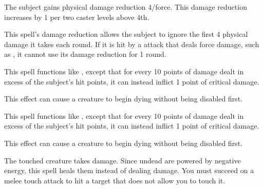 \spellrng{\rngclose}
\spelldur{\durshort}
\begin{spelleffect}
  The subject gains physical damage reduction 4/force. This damage reduction increases by 1 per two caster levels above 4th.
\end{spelleffect}
\begin{spellnotes}
  This spell's damage reduction allows the subject to ignore the first 4 physical damage it takes each round. If it is hit by a attack that deals force damage, such as , it cannot use its damage reduction for 1 round.
\end{spellnotes}

\begin{spelleffect}
  This spell functions like , except that for every 10 points of damage dealt in excess of the subject's hit points, it can instead inflict 1 point of critical damage.
\end{spelleffect}
\begin{spellnotes}
  This effect can cause a creature to begin dying without being disabled first.
\end{spellnotes}

\begin{spelleffect}
  This spell functions like , except that for every 10 points of damage dealt in excess of the subject's hit points, it can instead inflict 1 point of critical damage.
\end{spelleffect}
\begin{spellnotes}
  This effect can cause a creature to begin dying without being disabled first.
\end{spellnotes}

\spellrng{\rngtouch}
\begin{spelleffect}
  The touched creature takes damage. Since undead are powered by negative energy, this spell heals them instead of dealing damage. You must succeed on a melee touch attack to hit a target that does not allow you to touch it. 
\end{spelleffect}

